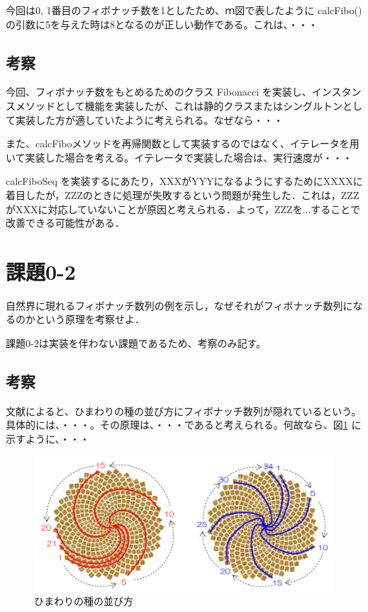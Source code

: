 \documentclass[a4j]{ujarticle}
\begin{document}
今回は0, 1番目のフィボナッチ数を1としたため、ｍ図で表したように calcFibo() の引数に5を与えた時は8となるのが正しい動作である。これは、・・・
\subsection{考察}
今回、フィボナッチ数をもとめるためのクラス Fibonacci を実装し、インスタンスメソッドとして機能を実装したが、これは静的クラスまたはシングルトンとして実装した方が適していたように考えられる。なぜなら・・・

また、calcFiboメソッドを再帰関数として実装するのではなく、イテレータを用いて実装した場合を考える。イテレータで実装した場合は、実行速度が・・・

calcFiboSeq を実装するにあたり，XXXがYYYになるようにするためにXXXXに着目したが，ZZZのときに処理が失敗するという問題が発生した．これは，ZZZがXXXに対応していないことが原因と考えられる．よって，ZZZを...することで改善できる可能性がある．

\section{課題0-2}
\begin{screen}
  自然界に現れるフィボナッチ数列の例を示し，なぜそれがフィボナッチ数列になるのかという原理を考察せよ．
\end{screen}

課題0-2は実装を伴わない課題であるため、考察のみ記す。

\subsection{考察}
文献\cite{kijima2012}によると、ひまわりの種の並び方にフィボナッチ数列が隠れているという。具体的には、・・・。その原理は、・・・であると考えられる。何故なら、図\ref{fig:himawari} \cite{notty} に示すように、・・・

\begin{figure}[!hbt]
  \centering
  \includegraphics[bb=0 0 782 352,width=0.6\linewidth]{himawari.png}
  \caption{ひまわりの種の並び方}
  \label{fig:himawari}
\end{figure}
\end{document}
